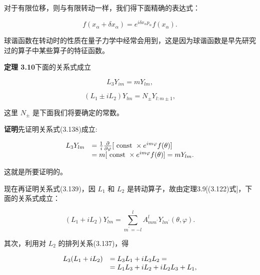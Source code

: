 对于有限位移，则与有限转动一样，我们得下面精确的表达式：

\begin{equation*}
f (x _ {\alpha} + \delta x _ {\alpha}) = e ^ {i \delta x _ {\alpha} p _ {\alpha}} f (x _ {\alpha}).
\end{equation*}

球谐函数在转动时的性质在量子力学中经常会用到，这是因为球谐函数是早先研究过的算子中某些算子的特征函数。

\textbf{定理 3.10}\quad 下面的关系式成立

\begin{equation*}
L _ {3} Y _ {i m} = m Y _ {l m},\tag{3.138}
\end{equation*}

\begin{equation*}
\left(L _ {1} \pm i L _ {2}\right) Y _ {l m} = N _ {\pm} Y _ {l: m \pm 1},\tag{3.139}
\end{equation*}

这里 $N_{\pm}$ 是下面我们将要确定的常数。

\textbf{证明}\quad 先证明关系式(3.138)成立:

\begin{equation*}
\begin{array}{r l} L _ {3} Y _ {l m} & = \frac {1}{i} \frac {\partial}{\partial \varphi} [ \text { const } \times e ^ {i m \varphi} f (\theta) ] \\ & = m [ \text { const } \times e ^ {i m \varphi} f (\theta) ] = m Y _ {l m}. \end{array}
\end{equation*}

这就是所要证明的。

现在再证明关系式(3.139)，因 $L_{1}$ 和 $L_{2}$ 是转动算子，故由定理3.9[(3.122)式]，下面的关系式成立：

\begin{equation*}
\left(L _ {1} + i L _ {2}\right) Y _ {l m} = \sum_ {m ^ {\prime} = - l} ^ {l} A _ {m m ^ {\prime}} ^ {l} Y _ {l m ^ {\prime}} (\theta , \varphi).\tag{3.140}
\end{equation*}

其次，利用对 $L_{2}$ 的排列关系(3.137)，得

\begin{equation*}
\begin{array}{r l} L _ {3} (L _ {1} + i L _ {2}) & = L _ {3} L _ {1} + i L _ {3} L _ {2} = \\ & = L _ {1} L _ {3} + i L _ {2} + i L _ {2} L _ {3} + L _ {1}, \end{array}
\end{equation*}

